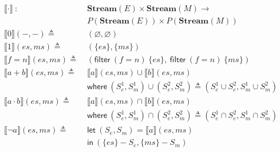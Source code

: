 \documentclass[12pt, letterpaper]{article}
\let\emptyset\varnothing
\newcommand\interp[1]{\llbracket #1 \rrbracket}
\def \sysname {\textsc{GARUDA 2.0}\xspace}
\def \oldname {\textsc{GARUDA}\xspace}
\begin{document}
          {\centering
          \begin{align*}
            \interp{ \cdot }\ 
              :\ \ &
              \mathbf{Stream}(E)\times \mathbf{Stream}(M) \rightarrow \\
              & P(\mathbf{Stream}(E))\times P(\mathbf{Stream}(M)) 
              \\
            \interp{ 0 }(-, -)
              \triangleq\ &
              (\emptyset , \emptyset)
              \\ %
            \interp{ 1 }(es, ms)
              \triangleq\ &
              (\{es\},\{ms\})
              \\
            \interp{ f=n }(es, ms)
              \triangleq\ &
              (\mathsf{filter}\ (f=n)\ \{es\},\
               \mathsf{filter}\ (f=n)\ \{ms\}) 
              \\
            \interp{ a + b }(es, ms)
              \triangleq\ &
              \interp { a }(es, ms)\cup
              \interp { b }(es, ms) \\
              &\mathsf{where}\ (S_e^1, S_m^1)\cup (S_e^2, S_m^2)\triangleq
                (S_e^1\cup S_e^2, S_m^1\cup S_m^2)\\
            \interp { a \cdot b }(es, ms)
              \triangleq\ &
              \interp { a }(es, ms)\cap
              \interp { b }(es, ms) \\
              &\mathsf{where}\ (S_e^1, S_m^1)\cap (S_e^2, S_m^2)\triangleq
                (S_e^1\cap S_e^2, S_m^1\cap S_m^2)\\
            \interp { \neg a }(es, ms)
              \triangleq\ &
              \mathsf{let}\ (S_e, S_m) = \interp {a}(es, ms) \\
              &\mathsf{in}\ (\{es\} - S_e, \{ms\} - S_m)
              \\
          \end{align*}}
\end{document}
